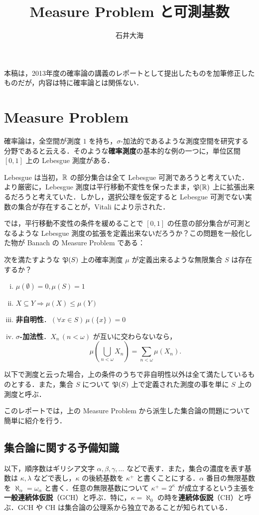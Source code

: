 \documentclass[a4j]{jsarticle}
\title{Measure Problem と可測基数}
\author{石井大海}
\begin{document}
\maketitle

本稿は，2013年度の確率論の講義のレポートとして提出したものを加筆修正したものだが，内容は特に確率論とは関係ない．

\section{Measure Problem}
確率論は，全空間が測度 $1$ を持ち，$\sigma$-加法的であるような測度空間を研究する分野であると云える．そのような{\bfseries 確率測度}の基本的な例の一つに，単位区間 $[0, 1]$ 上の Lebesgue 測度がある．

Lebesgue は当初，$\mathbb{R}$ の部分集合は全て Lebesgue 可測であろうと考えていた．より厳密に，Lebesgue 測度は平行移動不変性を保ったまま，$\mathfrak{P}(\mathbb{R})$ 上に拡張出来るだろうと考えていた．しかし，選択公理を仮定すると Lebesgue 可測でない実数の集合が存在することが，Vitali により示された．

では，平行移動不変性の条件を緩めることで $[0, 1]$ の任意の部分集合が可測となるような Lebesgue 測度の拡張を定義出来ないだろうか？この問題を一般化した物が Banach の Measure Problem である：

\begin{problem}
 次を満たすような $\mathfrak{P}(S)$ 上の確率測度 $\mu$ が定義出来るような無限集合 $S$ は存在するか？
 \begin{enumerate}[(i)]
  \item $\mu(\emptyset) = 0, \mu(S) = 1$
  \item $X \subseteq Y \Rightarrow \mu(X) \leq \mu(Y)$
  \item {\bfseries 非自明性}．$(\forall x \in S)\, \mu(\{x\}) = 0$
  \item {\bfseries $\sigma$-加法性}．$X_n \, (n < \omega)$ が互いに交わらないなら，
	\[
	 \mu\left(\bigcup_{n < \omega} X_n\right) = \sum_{n < \omega} \mu(X_n).
	\]
 \end{enumerate}
\end{problem}

以下で測度と云った場合，上の条件のうちで非自明性以外は全て満たしているものとする．また，集合 $S$ について $\mathfrak{P}(S)$ 上で定義された測度の事を単に $S$ 上の測度と呼ぶ．

このレポートでは，上の Measure Problem から派生した集合論の問題について簡単に紹介を行う．

\subsection{集合論に関する予備知識}
以下，順序数はギリシア文字 $\alpha, \beta, \gamma, \dots$ などで表す．また，集合の濃度を表す基数は $\kappa, \lambda$ などで表し，$\kappa$ の後続基数を $\kappa^+$ と書くことにする．$\alpha$ 番目の無限基数を $\aleph_\alpha = \omega_\alpha$ と書く．任意の無限基数について $\kappa^+ = 2^\kappa$ が成立するという主張を{\bfseries 一般連続体仮説}（GCH）と呼ぶ．特に，$\kappa = \aleph_0$ の時を{\bfseries 連続体仮説}（CH）と呼ぶ．GCH や CH は集合論の公理系から独立であることが知られている．
\end{document}

